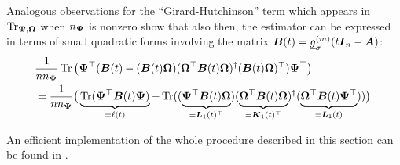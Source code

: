 Analogous observations for the \enquote{Girard-Hutchinson} term which appears in $\operatorname{Tr}_{\boldsymbol{\Psi}, \boldsymbol{\Omega}}$ when $n_{\boldsymbol{\Psi}}$ is nonzero show that also then, the estimator can be expressed in terms of small quadratic forms involving the matrix $\boldsymbol{B}(t) = \underline{g}_{\sigma}^{(m)}(t \boldsymbol{I}_n - \boldsymbol{A})$:
\begin{align}
    &\frac{1}{n n_{\boldsymbol{\Psi}}} \operatorname{Tr} \big(\boldsymbol{\Psi}^{\top} (\boldsymbol{B}(t) - (\boldsymbol{B}(t) \boldsymbol{\Omega}) (\boldsymbol{\Omega}^{\top} \boldsymbol{B}(t) \boldsymbol{\Omega})^{\dagger} (\boldsymbol{B}(t) \boldsymbol{\Omega})^{\top}) \boldsymbol{\Psi}^{\top} \big) \notag \\
    &= \frac{1}{n n_{\boldsymbol{\Psi}}} \big( \underbrace{\operatorname{Tr}(\boldsymbol{\Psi}^{\top} \boldsymbol{B}(t)\boldsymbol{\Psi})}_{= \ell(t)} - \operatorname{Tr}((\underbrace{\boldsymbol{\Psi}^{\top} \boldsymbol{B}(t) \boldsymbol{\Omega}}_{= \boldsymbol{L}_1(t)^{\top}}) (\underbrace{\boldsymbol{\Omega}^{\top} \boldsymbol{B}(t) \boldsymbol{\Omega}}_{= \boldsymbol{K}_1(t)^{\top}})^{\dagger} (\underbrace{\boldsymbol{\Omega}^{\top} \boldsymbol{B}(t) \boldsymbol{\Psi}^{\top}}_{= \boldsymbol{L}_1(t)})) \big).
    \label{equ:cyclic-property-hutchinson}
\end{align}

An efficient implementation of the whole procedure described in this section can be found in .

